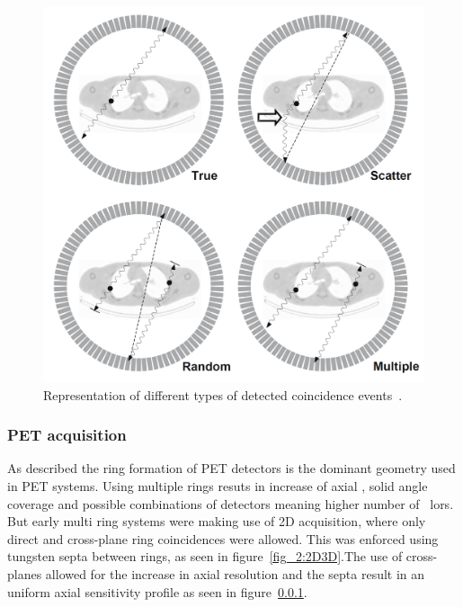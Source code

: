 \begin{figure} [h!]
\centering
\includegraphics[scale=0.22,angle=0]{2_Theory_Methods/figures/Bailey_Scatter_Random_events.png}
\caption{Representation of different types of detected coincidence events~\cite{Bailey2005}. } 
\label{fig_2:BlockDetectorAndRing}
\end{figure} 
%
%
\subsubsection{PET acquisition}
As described the ring formation of PET detectors is the dominant geometry used in PET systems. Using multiple rings resuts in increase of axial , solid angle coverage and possible combinations of detectors meaning higher number of ~\glspl{lor}. But early multi ring systems were making use of 2D acquisition, where only direct and cross-plane ring coincidences were allowed. 
This was enforced using tungsten septa between rings, as seen in figure~\ref{fig_2:2D3D}.The use of cross-planes allowed for the increase in axial resolution and the septa result in an uniform axial sensitivity profile as seen in figure~\ref{}. 

